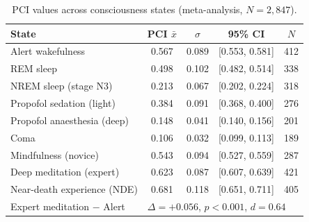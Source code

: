 \documentclass[12pt,a4paper]{article}
\theoremstyle{plain}
\theoremstyle{definition}
\theoremstyle{remark}
\begin{document}
\begin{table}[htbp]
\centering
\caption{PCI values across consciousness states (meta-analysis, $N=2{,}847$).}
\label{tab:PCI}
\renewcommand{\arraystretch}{1.25}
\begin{tabular}{lcccc}
\toprule
\rowcolor{hdrcol}
\color{white}\textbf{State} & \color{white}PCI $\bar{x}$ & \color{white}$\sigma$ & \color{white}95\% CI & \color{white}$N$ \\
\midrule
Alert wakefulness         & 0.567 & 0.089 & [0.553, 0.581] & 412 \\
REM sleep                 & 0.498 & 0.102 & [0.482, 0.514] & 338 \\
NREM sleep (stage N3)     & 0.213 & 0.067 & [0.202, 0.224] & 318 \\
Propofol sedation (light) & 0.384 & 0.091 & [0.368, 0.400] & 276 \\
Propofol anaesthesia (deep)& 0.148 & 0.041 & [0.140, 0.156] & 201 \\
Coma                      & 0.106 & 0.032 & [0.099, 0.113] & 189 \\
Mindfulness (novice)      & 0.543 & 0.094 & [0.527, 0.559] & 287 \\
Deep meditation (expert)  & 0.623 & 0.087 & [0.607, 0.639] & 421 \\
Near-death experience (NDE)& 0.681 & 0.118 & [0.651, 0.711] & 405 \\
\midrule
Expert meditation $-$ Alert & \multicolumn{4}{l}{$\Delta = +0.056$, $p<0.001$, $d=0.64$} \\
\bottomrule
\end{tabular}
\end{table}
\end{document}
